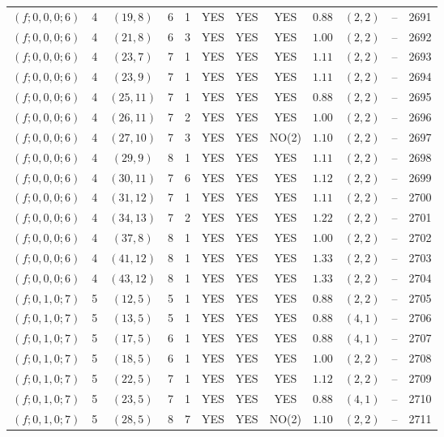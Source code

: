 \begin{longtable}{|c|c|c|c|c|c|c|c|c|c|c|c|}
$(f;0,0,0;6)$ & 4 & $(19,8)$ & 6 & 1 & YES & YES & YES & $0.88$ & $(2,2)$ & -- & 2691\\
$(f;0,0,0;6)$ & 4 & $(21,8)$ & 6 & 3 & YES & YES & YES & $1.00$ & $(2,2)$ & -- & 2692\\
$(f;0,0,0;6)$ & 4 & $(23,7)$ & 7 & 1 & YES & YES & YES & $1.11$ & $(2,2)$ & -- & 2693\\
$(f;0,0,0;6)$ & 4 & $(23,9)$ & 7 & 1 & YES & YES & YES & $1.11$ & $(2,2)$ & -- & 2694\\
$(f;0,0,0;6)$ & 4 & $(25,11)$ & 7 & 1 & YES & YES & YES & $0.88$ & $(2,2)$ & -- & 2695\\
$(f;0,0,0;6)$ & 4 & $(26,11)$ & 7 & 2 & YES & YES & YES & $1.00$ & $(2,2)$ & -- & 2696\\
$(f;0,0,0;6)$ & 4 & $(27,10)$ & 7 & 3 & YES & YES & NO(2) & $1.10$ & $(2,2)$ & -- & 2697\\
$(f;0,0,0;6)$ & 4 & $(29,9)$ & 8 & 1 & YES & YES & YES & $1.11$ & $(2,2)$ & -- & 2698\\
$(f;0,0,0;6)$ & 4 & $(30,11)$ & 7 & 6 & YES & YES & YES & $1.12$ & $(2,2)$ & -- & 2699\\
$(f;0,0,0;6)$ & 4 & $(31,12)$ & 7 & 1 & YES & YES & YES & $1.11$ & $(2,2)$ & -- & 2700\\
$(f;0,0,0;6)$ & 4 & $(34,13)$ & 7 & 2 & YES & YES & YES & $1.22$ & $(2,2)$ & -- & 2701\\
$(f;0,0,0;6)$ & 4 & $(37,8)$ & 8 & 1 & YES & YES & YES & $1.00$ & $(2,2)$ & -- & 2702\\
$(f;0,0,0;6)$ & 4 & $(41,12)$ & 8 & 1 & YES & YES & YES & $1.33$ & $(2,2)$ & -- & 2703\\
$(f;0,0,0;6)$ & 4 & $(43,12)$ & 8 & 1 & YES & YES & YES & $1.33$ & $(2,2)$ & -- & 2704\\
$(f;0,1,0;7)$ & 5 & $(12,5)$ & 5 & 1 & YES & YES & YES & $0.88$ & $(2,2)$ & -- & 2705\\
$(f;0,1,0;7)$ & 5 & $(13,5)$ & 5 & 1 & YES & YES & YES & $0.88$ & $(4,1)$ & -- & 2706\\
$(f;0,1,0;7)$ & 5 & $(17,5)$ & 6 & 1 & YES & YES & YES & $0.88$ & $(4,1)$ & -- & 2707\\
$(f;0,1,0;7)$ & 5 & $(18,5)$ & 6 & 1 & YES & YES & YES & $1.00$ & $(2,2)$ & -- & 2708\\
$(f;0,1,0;7)$ & 5 & $(22,5)$ & 7 & 1 & YES & YES & YES & $1.12$ & $(2,2)$ & -- & 2709\\
$(f;0,1,0;7)$ & 5 & $(23,5)$ & 7 & 1 & YES & YES & YES & $0.88$ & $(4,1)$ & -- & 2710\\
$(f;0,1,0;7)$ & 5 & $(28,5)$ & 8 & 7 & YES & YES & NO(2) & $1.10$ & $(2,2)$ & -- & 2711\\

\end{longtable}
